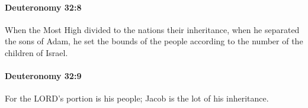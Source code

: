 		\paragraph{Deuteronomy 32:8} %
			\label{DEUTERONOMY-32-8}

			When the Most High divided to the nations their inheritance, when he separated the sons of Adam, he set the bounds of the people according to the number of the children of Israel.


		\paragraph{Deuteronomy 32:9} %
			\label{DEUTERONOMY-32-9}

			For the LORD's portion is his people; Jacob is the lot of his inheritance.


